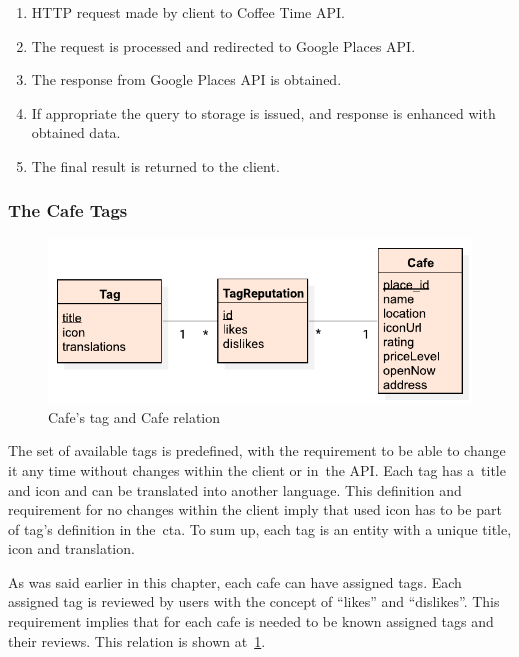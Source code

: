 \begin{enumerate}
    \item HTTP request made by client to Coffee Time API.
    \item The request is processed and redirected to Google Places API.
    \item The response from Google Places API is obtained.
    \item If appropriate the query to storage is issued, and response is enhanced with obtained data.
    \item The final result is returned to the client.
\end{enumerate}
\subsubsection{The Cafe Tags}

\begin{figure}[ht]
    \centering
    \includegraphics[width=0.8\linewidth]{img/analysis/tag-cafe-relation.pdf}
    \caption{Cafe's tag and Cafe relation}
    \label{fig:tag-cafe-relation}
\end{figure}

The set of available tags is predefined, with the requirement to be able to change it any time without changes within the client or in~the API. Each tag has a~title and icon and can be translated into another language. This definition and requirement for no changes within the client imply that used icon has to be part of tag's definition in the~\gls{cta}. To sum up, each tag is an entity with a unique title, icon and translation. 

As was said earlier in this chapter, each cafe can have assigned tags. Each assigned tag is reviewed by users with the concept of ``likes'' and ``dislikes''.  This requirement implies that for each cafe is needed to be known assigned tags and their reviews. This relation is shown at~\cref{fig:tag-cafe-relation}.
